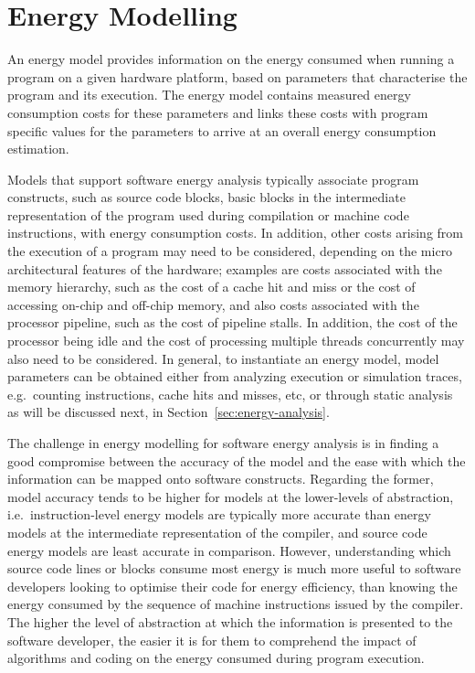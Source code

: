 \nopagebreak
\section{Energy Modelling}\label{sec:energy-models}

An energy model provides information on the energy consumed when running a program on a given hardware platform, based on parameters that characterise the program and its execution. The energy model contains measured energy consumption costs for these parameters and links these costs with program specific values for the parameters to arrive at an overall energy consumption estimation. 

Models that support software energy analysis typically associate program constructs, such as source code blocks, basic blocks in the intermediate representation of the program used during compilation or machine code instructions, with energy consumption costs. In addition, other costs arising from the execution of a program may need to be considered, depending on the micro architectural features of the hardware; examples are costs associated with the memory hierarchy, such as the cost of a cache hit and miss or the cost of accessing on-chip and off-chip memory, and also costs associated with the processor pipeline, such as the cost of pipeline stalls. In addition, the cost of the processor being idle and the cost of processing multiple threads concurrently may also need to be considered. 
%
In general, to instantiate an energy model, model parameters can be obtained either from analyzing execution or simulation traces, e.g.\ counting instructions, cache hits and misses, etc, or through static analysis as will be discussed next, in Section~\ref{sec:energy-analysis}.


The challenge in energy modelling for software energy analysis is in finding a good compromise between the accuracy of the model and the ease with which the information can be mapped onto software constructs. Regarding the former, model accuracy tends to be higher for models at the lower-levels of abstraction, i.e.\ instruction-level energy models are typically more accurate than energy models at the intermediate representation of the compiler, and source code energy models are least accurate in comparison. However, understanding which source code lines or blocks consume most energy is much more useful to software developers looking to optimise their code for energy efficiency, than knowing the energy consumed by the sequence of machine instructions issued by the compiler. The higher the level of abstraction at which the information is presented to the software developer, the easier it is for them to comprehend the impact of algorithms and coding on the energy consumed during program execution.



